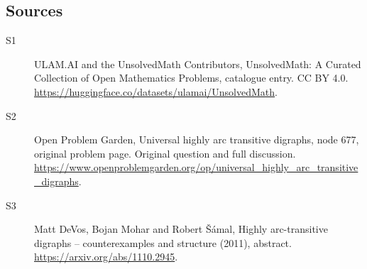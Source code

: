 \documentclass[11pt]{article}
\begin{document}
\subsection{Sources}
\begin{description}
\item[\hypertarget{source:statement:1}{S1}] ULAM.AI and the UnsolvedMath Contributors, UnsolvedMath: A Curated Collection of Open Mathematics Problems, catalogue entry. CC BY 4.0. \url{https://huggingface.co/datasets/ulamai/UnsolvedMath}.
\item[\hypertarget{source:statement:2}{S2}] Open Problem Garden, Universal highly arc transitive digraphs, node 677, original problem page. Original question and full discussion. \url{https://www.openproblemgarden.org/op/universal_highly_arc_transitive_digraphs}.
\item[\hypertarget{source:statement:3}{S3}] Matt DeVos, Bojan Mohar and Robert Šámal, Highly arc-transitive digraphs -- counterexamples and structure (2011), abstract. \url{https://arxiv.org/abs/1110.2945}.
\end{description}
\label{end:statement}
\end{document}
